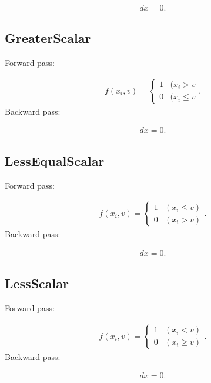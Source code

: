 \documentclass{article}
\begin{document}
\begin{eqnarray}
  dx = 0.
\end{eqnarray}

\subsection{GreaterScalar}

Forward pass:

\begin{eqnarray}
  f(x_i,v) = \begin{cases}
    1  & (x_i > v \\
    0 & (x_i \leq v
  \end{cases}.
\end{eqnarray}
%
Backward pass:

\begin{eqnarray}
  dx = 0.
\end{eqnarray}

\subsection{LessEqualScalar}

Forward pass:

\begin{eqnarray}
  f(x_i,v) = \begin{cases}
    1  & (x_i \leq v) \\
    0 & (x_i > v)
  \end{cases}.
\end{eqnarray}
%
Backward pass:

\begin{eqnarray}
  dx = 0.
\end{eqnarray}

\subsection{LessScalar}

Forward pass:

\begin{eqnarray}
  f(x_i,v) = \begin{cases}
    1  & (x_i < v) \\
    0 & (x_i \geq v)
  \end{cases}.
\end{eqnarray}
%
Backward pass:

\begin{eqnarray}
  dx = 0.
\end{eqnarray}
\end{document}
